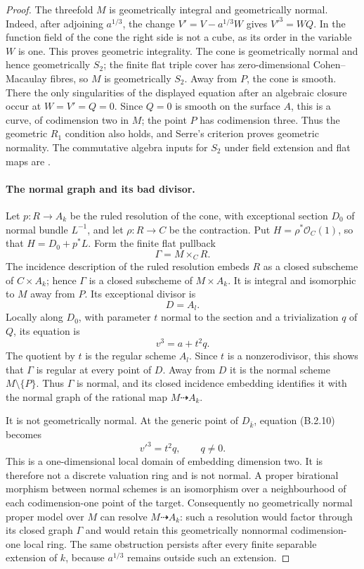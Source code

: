 \begin{proof}
The threefold $M$ is geometrically integral and geometrically
normal.  Indeed, after adjoining $a^{1/3}$, the change
$V'=V-a^{1/3}W$ gives $V'^3=WQ$.  In the function field of the
cone the right side is not a cube, as its order in the variable
$W$ is one.  This proves geometric integrality.
The cone is geometrically normal and hence geometrically $S_2$;
the finite flat triple cover has zero-dimensional
Cohen--Macaulay fibres, so $M$ is geometrically $S_2$.
Away from $P$, the cone is smooth.  There the only singularities
of the displayed equation after an algebraic closure occur at
$W=V'=Q=0$.  Since $Q=0$ is smooth on the surface $A$, this is
a curve, of codimension two in $M$; the point $P$ has codimension
three.  Thus the geometric $R_1$ condition also holds, and
Serre's criterion proves geometric normality.  The commutative
algebra inputs for $S_2$ under field extension and flat maps are
\cite[Tags 045M, 0339 and 031S]{StacksB}.

\paragraph{The normal graph and its bad divisor.}
Let $p:R\to A_k$ be the ruled resolution of the cone, with
exceptional section $D_0$ of normal bundle $L^{-1}$, and let
$\rho:R\to C$ be the contraction.  Put
$H=\rho^*\mathcal O_C(1)$, so that $H=D_0+p^*L$.
Form the finite flat pullback
\[
                    \Gamma=M\times_C R.
\]
The incidence description of the ruled resolution embeds
$R$ as a closed subscheme of $C\times A_k$; hence $\Gamma$
is a closed subscheme of $M\times A_k$.
It is integral and isomorphic to $M$ away from $P$.
Its exceptional divisor is
\[
                       D=A_l.
\]
Locally along $D_0$, with parameter $t$ normal to the section
and a trivialization $q$ of $Q$, its equation is
\[
                         v^3=a+t^2q.                 \tag{B.2.10}
\]
The quotient by $t$ is the regular scheme $A_l$.
Since $t$ is a nonzerodivisor, this shows that $\Gamma$ is
regular at every point of $D$.  Away from $D$ it is the normal
scheme $M\setminus\{P\}$.  Thus $\Gamma$ is normal, and its
closed incidence embedding identifies it with the normal graph
of the rational map $M\dashrightarrow A_k$.

It is not geometrically normal.  At the generic point of
$D_{\bar k}$, equation (B.2.10) becomes
\[
                    v'^3=t^2q,\qquad q\ne0.
\]
This is a one-dimensional local domain of embedding dimension
two.  It is therefore not a discrete valuation ring and is not
normal.  A proper birational morphism between normal schemes is
an isomorphism over a neighbourhood of each codimension-one
point of the target.  Consequently no geometrically normal
proper model over $M$ can resolve $M\dashrightarrow A_k$:
such a resolution would factor through its closed graph
$\Gamma$ and would retain this geometrically nonnormal
codimension-one local ring.  The same obstruction persists
after every finite separable extension of $k$, because
$a^{1/3}$ remains outside such an extension.


\end{proof}
